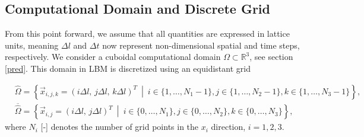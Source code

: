 \subsection{Computational Domain and Discrete Grid}
From this point forward, we assume that all quantities are expressed in lattice units, meaning $ \Delta l $ and $ \Delta t $ now represent non-dimensional spatial and time steps, respectively. We consider a cuboidal computational domain $ \Omega \subset \mathbb{R}^3 $, see section \ref{pred}. This domain in LBM is discretized using an equidistant grid

\begin{subequations}\label{eq:domain}
	\begin{eqnarray}
		&\hat{\Omega} = \left\{ \vec{x}_{i,j,k} = (i \Delta l,\,j \Delta l, \,k \Delta l)^T \ \middle| \ i \in \{1, \dots, N_{1} - 1\}, j \in \{1, \dots, N_{2} - 1 \}, k \in \{1, \dots, N_{3} - 1 \} \right\},\\[4pt]
		&\overline{\hat{\Omega}} = \left\{ \vec{x}_{i,j} = (i \Delta l,\,j \Delta l)^T \ \middle| \ i \in \{0, \dots, N_{1} \}, j \in \{0, \dots, N_{2} \}, k \in \{0, \dots, N_{3} \} \right\},
	\end{eqnarray}
\end{subequations}
where $ N_{i} $ [-] denotes the number of grid points in the $ x_i $ direction, $ i = 1, 2, 3 $.

